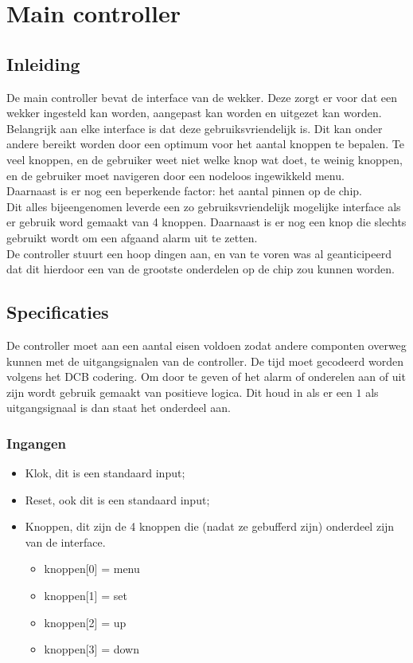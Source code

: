 \chapter{Main controller}
\section{Inleiding}
De main controller bevat de interface van de wekker. Deze zorgt er voor dat een wekker ingesteld kan worden, aangepast kan worden en uitgezet kan worden. 
Belangrijk aan elke interface is dat deze gebruiksvriendelijk is. 
Dit kan onder andere bereikt worden door een optimum voor het aantal knoppen te bepalen. 
Te veel knoppen, en de gebruiker weet niet welke knop wat doet, te weinig knoppen, en de gebruiker moet navigeren door een nodeloos ingewikkeld menu. \\
Daarnaast is er nog een beperkende factor: het aantal pinnen op de chip. \\
Dit alles bijeengenomen leverde een zo gebruiksvriendelijk mogelijke interface als er gebruik word gemaakt van 4 knoppen. Daarnaast is er nog een knop die slechts gebruikt wordt om een afgaand alarm uit te zetten. \\
De controller stuurt een hoop dingen aan, en van te voren was al geanticipeerd dat dit hierdoor een van de grootste onderdelen op de chip zou kunnen worden.

\section{Specificaties}
De controller moet aan een aantal eisen voldoen zodat andere componten overweg kunnen met de uitgangsignalen van de controller. De tijd moet gecodeerd worden volgens het DCB codering. Om door te geven of het alarm of onderelen aan of uit zijn wordt gebruik gemaakt van positieve logica. Dit houd in als er een $1$ als uitgangsignaal is dan staat het onderdeel aan.

\subsection{Ingangen}
\begin{itemize}[nolistsep]
\item Klok, dit is een standaard input;
\item Reset, ook dit is een standaard input;
\item Knoppen, dit zijn de 4 knoppen die (nadat ze gebufferd zijn) onderdeel zijn van de interface.
\begin{itemize}[nolistsep]
\item knoppen[0] = menu
\item knoppen[1] = set 
\item knoppen[2] = up
\item knoppen[3] = down\\
\end{itemize}
\end{itemize}



